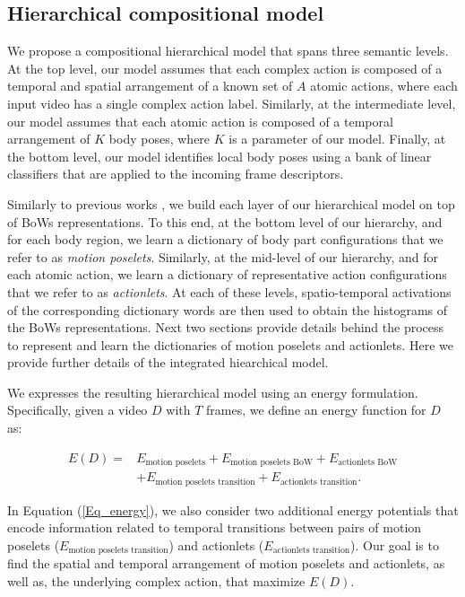 \subsection{Hierarchical compositional model}

We propose a compositional hierarchical model that spans three semantic levels. 
At the top level, our model assumes that each complex action is composed of a 
temporal and spatial arrangement of a known set of $A$ atomic actions, where 
each input video has a single complex action label. Similarly, at the 
intermediate level, our model assumes that each atomic action is composed of a 
temporal arrangement of $K$ body poses, where $K$ is a parameter of 
our model. Finally, at the bottom level, our model identifies local body poses 
using a bank of linear classifiers that are applied to the incoming frame 
descriptors. 

Similarly to previous works \cite{Lillo2014, Taralova:EtAl:2014}, we build 
each layer of our hierarchical model on top of BoWs 
representations. To this end, at the bottom level of our hierarchy, and for 
each body region, we learn a dictionary of body part configurations that we 
refer to as \emph{motion poselets}. Similarly, at the mid-level of our hierarchy, and 
for each atomic action, we learn a dictionary of representative action 
configurations that we refer to as \emph{actionlets}. At each of these levels, 
spatio-temporal activations of the corresponding dictionary words are then used 
to obtain the histograms of the BoWs representations. Next two sections provide 
details behind the process to represent and learn the dictionaries of motion 
poselets and actionlets. Here we provide further details of the 
integrated hiearchical model.

We expresses the resulting hierarchical model using an energy formulation. 
Specifically, given a video $D$ with $T$ frames, we
define an energy function for $D$ as:

\begin{align}\label{Eq_energy}
E(D) = & E_{\text{motion poselets}} + E_{\text{motion poselets BoW}} + 
E_{\text{actionlets BoW}} \nonumber \\ 
& + E_{\text{motion poselets transition}} + E_{\text{actionlets 
transition}}.
\end{align}

In Equation (\ref{Eq_energy}), we 
also 
consider two additional energy potentials that encode information related to 
temporal 
transitions between pairs of motion poselets ($E_{\text{motion poselets 
transition}}$) and 
actionlets ($E_{\text{actionlets transition}}$). Our goal is to find the 
spatial and temporal arrangement 
of motion poselets and actionlets, as well as, the underlying 
complex action, that maximize $E(D)$. 

